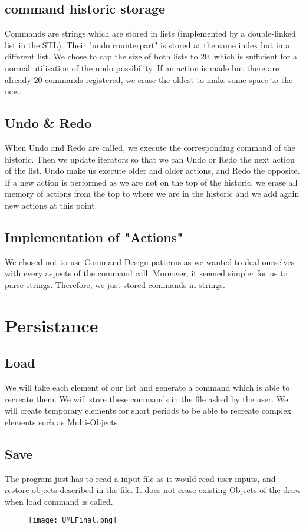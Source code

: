 \documentclass[a4paper, 12pts]{article}
\begin{document}
    \subsection{command historic storage}
        Commands are strings which are stored in lists (implemented by a double-linked list in the STL). Their "undo
        counterpart" is stored at the same index but in a different list. We chose to cap the size of both lists to 20,
        which is sufficient for a normal utilisation of the undo possibility. If an action is made but there are
        already 20 commands registered, we erase the oldest to make some space to the new.

   \subsection{Undo \& Redo}
	When Undo and Redo are called, we execute the corresponding command of the historic. Then we update iterators so that we can Undo or Redo the next action of the list. Undo make us execute older and older actions, and Redo the opposite. If a new action is performed as we are not on the top of the historic, we erase all memory of actions from the top to where we are in the historic and we add again new actions at this point.

   \subsection{Implementation of "Actions"}
	We chosed not to use Command Design patterns as we wanted to deal ourselves with every aspects of the command call. Moreover, it seemed simpler for us to parse strings. Therefore, we just stored commands in strings.

\section{Persistance}
    \subsection{Load}
	We will take each element of our list and generate a command which is able to recreate them. We will store these commands in the file asked by the user. We will create temporary elements for short periods to be able to recreate complex elements such as Multi-Objects.
    \subsection{Save}
	The program just has to read a input file as it would read user inputs, and restore objects described in the file. It does not erase existing Objects of the draw when load command is called.
\begin{figure}[b]
	\centerline{\texttt{[image: UMLFinal.png]}}
\end{figure}
\end{document}

